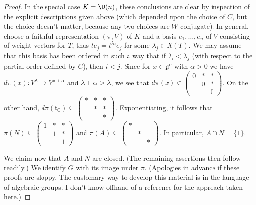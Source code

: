 \documentclass[reqno]{amsart} 
\begin{document}
\begin{proof}
  In the special case $K = \U(n)$, these conclusions are clear by inspection of the explicit descriptions given above (which depended upon the choice of $C$, but the choice doesn't matter, because any two choices are $W$-conjugate).  In general, choose a faithful representation $(\pi,V)$ of $K$ and a basis $e_1,\dotsc,e_n$ of $V$ consisting of weight vectors for $T$, thus $t e_j = t^{\lambda_j} e_j$ for some $\lambda_j \in X(T)$.  We may assume that this basis has been ordered in such a way that if $\lambda_i < \lambda_j$ (with respect to the partial order defined by $C$), then $i < j$.  Since for $x \in \mathfrak{g}^\alpha$ with $\alpha > 0$ we have $d \pi(x) : V^{\lambda} \rightarrow V^{\lambda+\alpha}$ and $\lambda + \alpha > \lambda$, we see that $d \pi(x) \in 
\begin{pmatrix}
    0 & \ast & \ast \\
    & 0 & \ast \\
    & & 0
  \end{pmatrix}
$.  On the other hand, $d \pi(\mathfrak{t}_{\mathbb{C}}) \subseteq 
\begin{pmatrix}
    \ast & \ast & \ast \\
    & \ast & \ast \\
    & & \ast
  \end{pmatrix}
$.  Exponentiating, it follows that $\pi(N) \subseteq 
\begin{pmatrix}
    1 & \ast & \ast \\
    & 1 & \ast \\
    & & 1
  \end{pmatrix}
$ and $\pi(A) \subseteq 
\begin{pmatrix}
    \ast &  &  \\
    & \ast &  \\
    & & \ast
  \end{pmatrix}
$.  In particular, $A \cap N = \{1\}$.

  We claim now that $A$ and $N$ are closed.  (The remaining assertions then follow readily.)  We identify $G$ with its image under $\pi$.  (Apologies in advance if these proofs are sloppy.  The customary way to develop this material is in the language of algebraic groups.  I don't know offhand of a reference for the approach taken here.)


\end{proof}
\end{document}
